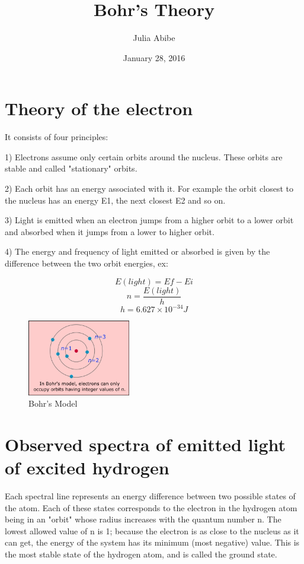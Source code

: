 \documentclass{article}
\title{Bohr's Theory}
\author{Julia Abibe}
\date{January 28, 2016}
\begin{document}
\maketitle

\section{Theory of the electron}
It consists of four principles:

1) Electrons assume only certain orbits around the nucleus. These orbits are stable and called "stationary" orbits.

2) Each orbit has an energy associated with it. For example the orbit closest to the nucleus has an energy E1, the next closest E2 and so on.

3) Light is emitted when an electron jumps from a higher orbit to a lower orbit and absorbed when it jumps from a lower to higher orbit.

4) The energy and frequency of light emitted or absorbed is given by the difference between the two orbit energies, ex:

$$E(light)=Ef-Ei$$
$$n= \frac{E(light)}{h}$$
$$h= 6.627 \times 10^{-34} J$$

\begin{figure}[h]
\begin{center}
\includegraphics[width=0.4\textwidth]{bohr1.jpg} %
\caption{Bohr's Model}
\end{center}
\end{figure}

\section{Observed spectra of emitted light of excited hydrogen}

Each spectral line represents an energy difference between two possible states of the atom. Each of these states corresponds to the electron in the hydrogen atom being in an "orbit" whose radius increases with the quantum number n. The lowest allowed value of n is 1; because the electron is as close to the nucleus as it can get, the energy of the system has its minimum (most negative) value. This is the most stable state of the hydrogen atom, and is called the ground state.
\end{document}
